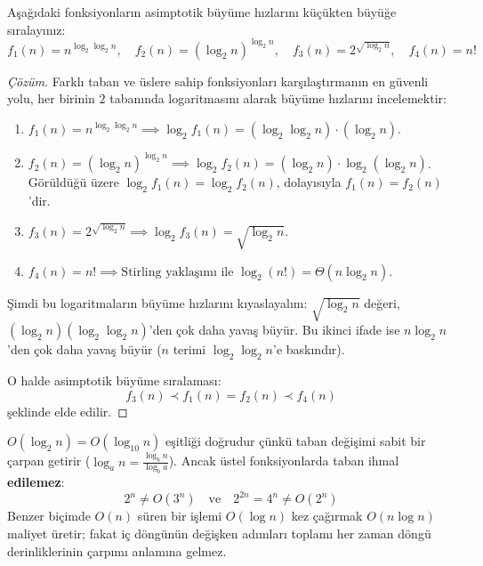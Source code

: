 \begin{example}
Aşağıdaki fonksiyonların asimptotik büyüme hızlarını küçükten büyüğe sıralayınız:
\[
f_1(n) = n^{\log_2 \log_2 n}, \quad f_2(n) = (\log_2 n)^{\log_2 n}, \quad f_3(n) = 2^{\sqrt{\log_2 n}}, \quad f_4(n) = n!
\]
\end{example}

\begin{proof}[Çözüm]
Farklı taban ve üslere sahip fonksiyonları karşılaştırmanın en güvenli yolu, her birinin $2$ tabanında logaritmasını alarak büyüme hızlarını incelemektir:

\begin{enumerate}
    \item $f_1(n) = n^{\log_2 \log_2 n} \implies \log_2 f_1(n) = (\log_2 \log_2 n) \cdot (\log_2 n)$.
    \item $f_2(n) = (\log_2 n)^{\log_2 n} \implies \log_2 f_2(n) = (\log_2 n) \cdot \log_2(\log_2 n)$.
    Görüldüğü üzere $\log_2 f_1(n) = \log_2 f_2(n)$, dolayısıyla $f_1(n) = f_2(n)$'dir.
    \item $f_3(n) = 2^{\sqrt{\log_2 n}} \implies \log_2 f_3(n) = \sqrt{\log_2 n}$.
    \item $f_4(n) = n! \implies \text{Stirling yaklaşımı ile } \log_2(n!) = \Theta(n \log_2 n)$.
\end{enumerate}

Şimdi bu logaritmaların büyüme hızlarını kıyaslayalım:
$\sqrt{\log_2 n}$ değeri, $(\log_2 n)(\log_2 \log_2 n)$'den çok daha yavaş büyür. Bu ikinci ifade ise $n \log_2 n$'den çok daha yavaş büyür ($n$ terimi $\log_2 \log_2 n$'e baskındır).

O halde asimptotik büyüme sıralaması:
\[
f_3(n) \prec f_1(n) = f_2(n) \prec f_4(n)
\]
şeklinde elde edilir.
\end{proof}

\begin{definition}
$O(\log_2 n) = O(\log_{10} n)$ eşitliği doğrudur çünkü taban değişimi sabit bir çarpan getirir ($\log_a n = \frac{\log_b n}{\log_b a}$). Ancak üstel fonksiyonlarda taban ihmal \textbf{edilemez}:
\[
2^n \ne O(3^n) \quad \text{ve} \quad 2^{2n} = 4^n \ne O(2^n)
\]
Benzer biçimde $O(n)$ süren bir işlemi $O(\log n)$ kez çağırmak $O(n \log n)$ maliyet üretir; fakat iç döngünün değişken adımları toplamı her zaman döngü derinliklerinin çarpımı anlamına gelmez.
\end{definition}

